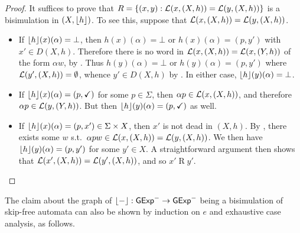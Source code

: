 \documentclass[orivec,envcountsect,envcountsame]{llncs}
\begin{document}
\restateprunebisimilar*
\begin{proof}
	It suffices to prove that $R = \{ (x, y) : \mathcal{L}(x, (X, h)) = \mathcal{L}(y, (X, h)) \}$ is a bisimulation in $(X, \lfloor h\rfloor)$.
	To see this, suppose that $\mathcal{L}(x, (X, h)) = \mathcal{L}(y, (X, h))$.
	\begin{itemize}
		\item
		If $\lfloor h\rfloor(x)(\alpha) = \bot$, then $h(x)(\alpha) = \bot$ or $h(x)(\alpha) = (p, y')$ with $x' \in D(X, h)$.
		Therefore there is no word in $\mathcal{L}(x, (X, h)) = \mathcal{L}(x, (Y, h))$ of the form $\alpha{}w$, by .
		Thus $h(y)(\alpha) = \bot$ or $h(y)(\alpha) = (p, y')$ where $\mathcal{L}(y', (X, h)) = \emptyset$, whence $y' \in D(X, h)$ by .
		In either case, $\lfloor h\rfloor(y)(\alpha) = \bot$.

		\item
		If $\lfloor h\rfloor(x)(\alpha) = (p, \checkmark)$ for some $p \in \Sigma$, then $\alpha{}p \in \mathcal{L}(x, (X, h))$, and therefore $\alpha{}p \in \mathcal{L}(y, (Y, h))$.
		But then $\lfloor h\rfloor(y)(\alpha) = (p, \checkmark)$ as well.

		\item
		If $\lfloor h\rfloor(x)(\alpha) = (p, x') \in \Sigma \times X$, then $x'$ is not dead in $(X, h)$.
        By , there exists some $w$ s.t.\ $\alpha{}pw \in \mathcal{L}(x, (X, h)) = \mathcal{L}(y, (X, h))$.
		We then have $\lfloor h\rfloor(y)(\alpha) = (p, y')$ for some $y' \in X$.
		A straightforward argument then shows that $\mathcal{L}(x', (X, h)) = \mathcal{L}(y', (X, h))$, and so $x' \mathrel{R} y'$.
	\end{itemize}
\end{proof}

\noindent
The claim about the graph of $\lfloor-\rfloor: \mathsf{GExp}^- \to \mathsf{GExp}^-$ being a bisimulation of skip-free automata can also be shown by induction on $e$ and exhaustive case analysis, as follows.
\end{document}
